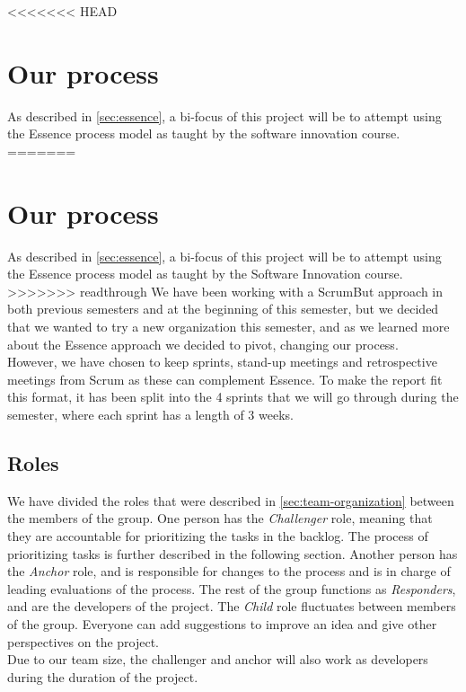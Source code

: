 <<<<<<< HEAD
\section{Our process}\label{sprint1:ourprocess}
As described in \autoref{sec:essence}, a bi-focus of this project will be to attempt using the Essence process model as taught by the software innovation course.
=======
\section{Our process}
As described in \autoref{sec:essence}, a bi-focus of this project will be to attempt using the Essence process model as taught by the Software Innovation course.
>>>>>>> readthrough
We have been working with a ScrumBut approach in both previous semesters and at the beginning of this semester, but we decided that we wanted to try a new organization this semester, and as we learned more about the Essence approach we decided to pivot, changing our process. \\
However, we have chosen to keep sprints, stand-up meetings and retrospective meetings from Scrum as these can complement Essence.
To make the report fit this format, it has been split into the 4 sprints that we will go through during the semester, where each sprint has a length of 3 weeks.

\subsection{Roles}
We have divided the roles that were described in \autoref{sec:team-organization} between the members of the group.
One person has the \textit{Challenger} role, meaning that they are accountable for prioritizing the tasks in the backlog.
The process of prioritizing tasks is further described in the following section.
Another person has the \textit{Anchor} role, and is responsible for changes to the process and is in charge of leading evaluations of the process.
The rest of the group functions as \textit{Responders}, and are the developers of the project.
The \textit{Child} role fluctuates between members of the group.
Everyone can add suggestions to improve an idea and give other perspectives on the project. \\
Due to our team size, the challenger and anchor will also work as developers during the duration of the project.

